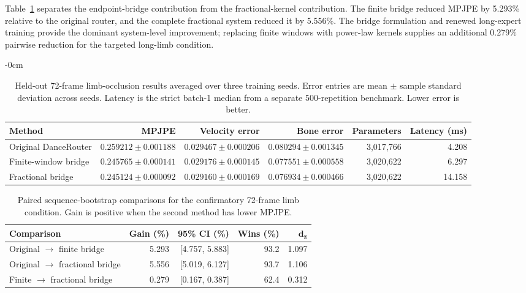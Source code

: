 \documentclass[fractalfract,article,submit,moreauthors,pdftex]{Definitions/mdpi}
\begin{document}
Table~\ref{tab:main_results} separates the endpoint-bridge contribution from the fractional-kernel contribution. The finite bridge reduced MPJPE by 5.293\% relative to the original router, and the complete fractional system reduced it by 5.556\%. The bridge formulation and renewed long-expert training provide the dominant system-level improvement; replacing finite windows with power-law kernels supplies an additional 0.279\% pairwise reduction for the targeted long-limb condition.

\begin{table}[H]
\caption{Held-out 72-frame limb-occlusion results averaged over three training seeds. Error entries are mean $\pm$ sample standard deviation across seeds. Latency is the strict batch-1 median from a separate 500-repetition benchmark. Lower error is better.\label{tab:main_results}}
\begin{adjustwidth}{-\extralength}{0cm}
\scriptsize
\begin{tabular}{lrrrrr}
\toprule
\textbf{Method} & \textbf{MPJPE} & \textbf{Velocity error} & \textbf{Bone error} & \textbf{Parameters} & \textbf{Latency (ms)}\\
\midrule
Original DanceRouter & $0.259212\pm0.001188$ & $0.029467\pm0.000206$ & $0.080294\pm0.001345$ & 3,017,766 & 4.208\\
Finite-window bridge & $0.245765\pm0.000141$ & $0.029176\pm0.000145$ & $0.077551\pm0.000558$ & 3,020,622 & 6.297\\
Fractional bridge & $\mathbf{0.245124\pm0.000092}$ & $\mathbf{0.029160\pm0.000169}$ & $\mathbf{0.076934\pm0.000466}$ & 3,020,622 & 14.158\\
\bottomrule
\end{tabular}
\end{adjustwidth}
\end{table}

\begin{table}[H]
\caption{Paired sequence-bootstrap comparisons for the confirmatory 72-frame limb condition. Gain is positive when the second method has lower MPJPE.\label{tab:bootstrap}}
\begin{tabularx}{\textwidth}{Xrrrr}
\toprule
\textbf{Comparison} & \textbf{Gain (\%)} & \textbf{95\% CI (\%)} & \textbf{Wins (\%)} & $\mathbf{d_z}$\\
\midrule
Original $\rightarrow$ finite bridge & 5.293 & [4.757, 5.883] & 93.2 & 1.097\\
Original $\rightarrow$ fractional bridge & 5.556 & [5.019, 6.127] & 93.7 & 1.106\\
Finite $\rightarrow$ fractional bridge & 0.279 & [0.167, 0.387] & 62.4 & 0.312\\
\bottomrule
\end{tabularx}
\end{table}
\end{document}
